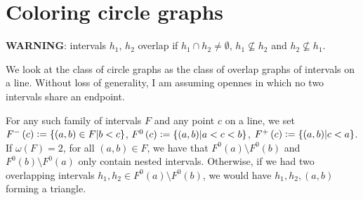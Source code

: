 \documentclass[12pt]{article}
\theoremstyle{definition}
\newcommand{\defeq}{\vcentcolon=}
\begin{document}
    \section{Coloring circle graphs}
    
    \textbf{WARNING}: intervals
    $h_1$, $h_2$ overlap if
    $h_1 \cap h_2 \neq \emptyset$,
    $h_1 \not \subseteq h_2$ and
    $h_2 \not \subseteq h_1$.
    \vspace{4pt}

    We look at the class
    of circle graphs as the class
    of overlap graphs of intervals on a line.
    Without loss of generality,
    {I am assuming opennes}
    in which no two intervals
    share an endpoint.

    For any such family of intervals
    $F$ and any point $c$ on a line,
    we set $F^{-}\left(c\right) \defeq
    \left\{\left(a, b\right) \in F
    \middle| b < c\right\}$,
    $F^{0}\left(c\right) \defeq
    \left\{\left(a, b\right)
    \middle| a < c < b\right\}$,
    $F^{+}\left(c\right) \defeq
    \left\{\left(a, b\right)
    \middle| c < a\right\}$.
    If $\omega\left(F\right) = 2$,
    for all $\left(a, b\right) \in F$,
    we have that
    $F^{0}\left(a\right) \setminus F^{0}\left(b\right)$ 
    and $F^{0}\left(b\right) \setminus F^{0}\left(a\right)$
    only contain nested intervals.
    Otherwise, if we had two
    overlapping intervals $h_1, h_2 \in
    F^{0}\left(a\right) \setminus F^{0}\left(b\right)$,
    we would have $h_1, h_2, \left(a, b\right)$ 
    forming a triangle.
\end{document}
